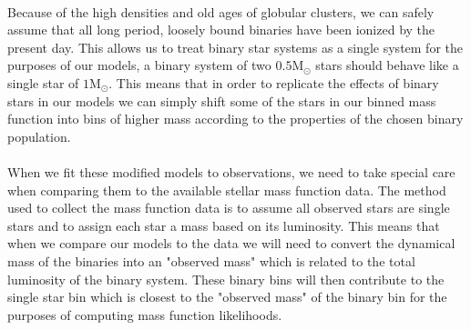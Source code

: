 \documentclass[12pt,letterpaper]{article}
\begin{document}
\paragraph{}
Because of the high densities and old ages of globular clusters, we can safely assume that all long
period, loosely bound binaries have been ionized by the present day. This allows us to treat binary
star systems as a single system for the purposes of our models, a binary system of two $0.5
\mathrm{M}_\odot$ stars should behave like a single star of $ 1 \mathrm{M}_\odot$. This means that
in order to replicate the effects of binary stars in our models we can simply shift some of the
stars in our binned mass function into bins of higher mass according to the properties of the chosen
binary population.
\paragraph{}
When we fit these modified models to observations, we need to take special care when comparing them
to the available stellar mass function data. The method used to collect the mass function data is to
assume all observed stars are single stars and to assign each star a mass based on its luminosity.
This means that when we compare our models to the data we will need to convert the dynamical mass of
the binaries into an "observed mass" which is related to the total luminosity of the binary system.
These binary bins will then contribute to the single star bin which is closest to the "observed
mass" of the binary bin for the purposes of computing mass function likelihoods.
\end{document}
